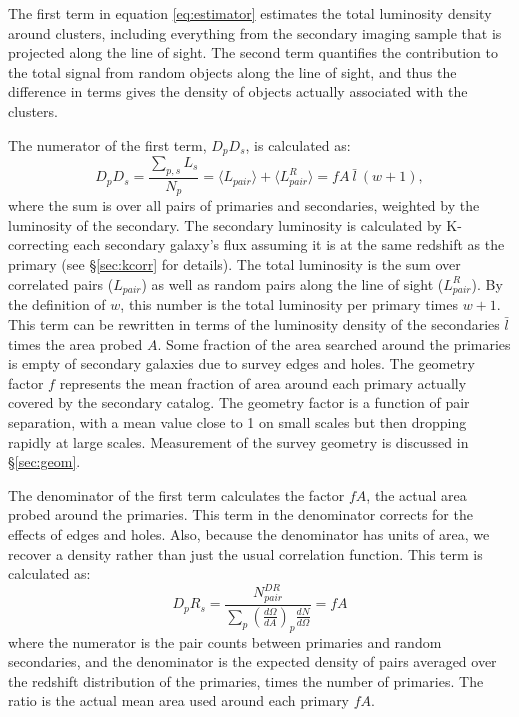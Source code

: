 \documentclass{emulateapj}
\begin{document}
The first term in equation \ref{eq:estimator} estimates the total luminosity
density around clusters, including everything from the secondary imaging
sample that is projected along the line of sight. The second term quantifies the contribution to the total signal from
random objects along the line of sight, and thus the difference in terms gives the density of objects actually associated with the clusters.


The numerator of the first term, $D_p D_s$, is calculated as:
\begin{equation}
D_p D_s = \frac{\sum_{p,s}{L_s}}{N_p} 
  = \langle L_{pair} \rangle + \langle L^R_{pair} \rangle 
  = f A~\bar{l}~(w + 1),
\end{equation}
where the sum is over all pairs of primaries and secondaries, weighted by the
luminosity of the secondary.  The secondary luminosity is calculated by
K-correcting each secondary galaxy's flux assuming it is at the same redshift
as the primary (see \S \ref{sec:kcorr} for details). The total luminosity is
the sum over correlated pairs ($L_{pair}$) as well as random pairs along the
line of sight ($L^R_{pair}$). By the definition of $w$, this number is the total
luminosity per primary times $w+1$. This term can be rewritten in terms of the
luminosity density of the secondaries $\bar{l}$ times the area probed $A$.
Some fraction of the area searched around the primaries is empty of secondary
galaxies due to survey edges and holes. The geometry factor $f$ represents the mean
fraction of area around each primary actually covered by the secondary catalog. The geometry factor
is a function of pair separation, with a mean value close to 1 on small scales
but then dropping rapidly at large scales. Measurement of the survey geometry is discussed in \S \ref{sec:geom}.


The denominator of the first term calculates the factor $f A$, the actual area
probed around the primaries.  This term in the denominator corrects for the
effects of edges and holes. Also, because the denominator has units of area, we recover a
density rather than just the usual correlation function. This term is calculated as:
\begin{equation}
D_p R_s = \frac{ N^{DR}_{pair} }{ \sum_{p} \left( \frac{d\Omega}{dA} \right)_p \frac{dN}{d\Omega}  }
  = f A
\end{equation}
where the numerator is the pair counts between primaries and random secondaries, and
the denominator is the expected density of pairs averaged over the redshift
distribution of the primaries, times the number of primaries.  The ratio is the
actual mean area used around each primary $f A$.
\end{document}
